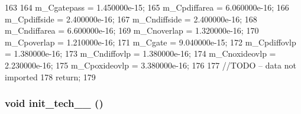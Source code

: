 \begin{DoxyCode}
163 {
164     m_Cgatepass = 1.450000e-15;
165     m_Cpdiffarea = 6.060000e-16; 
166     m_Cpdiffside = 2.400000e-16; 
167     m_Cndiffside = 2.400000e-16;
168     m_Cndiffarea = 6.600000e-16; 
169     m_Cnoverlap = 1.320000e-16;
170     m_Cpoverlap = 1.210000e-16;
171     m_Cgate = 9.040000e-15;
172     m_Cpdiffovlp = 1.380000e-16;
173     m_Cndiffovlp = 1.380000e-16;
174     m_Cnoxideovlp = 2.230000e-16;
175     m_Cpoxideovlp = 3.380000e-16;
176 
177     //TODO -- data not imported
178     return;
179 }
\end{DoxyCode}
\hypertarget{classTechParameter_a2309fd1d1526cfd38d60ddb5f67b26c0}{
\subsubsection[{init\_\-tech\_\-32\_\-90}]{\setlength{\rightskip}{0pt plus 5cm}void init\_\-tech\_\_ ()}}
\label{classTechParameter_a2309fd1d1526cfd38d60ddb5f67b26c0}



